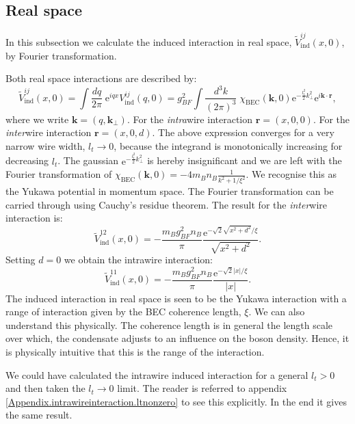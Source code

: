 \subsection{Real space}
\label{subsec.inducedinteraction.realspace}
In this subsection we calculate the induced interaction in real space, $\tilde{V}^{ij}_{\text{ind}}(x, 0)$, by Fourier transformation. 

Both real space interactions are described by: 
\begin{equation}
\tilde{V}^{ij}_{\text{ind}}(x, 0) = \int \frac{dq}{2\pi} \; \text{e}^{iqx} V^{ij}_{\text{ind}}(q, 0) = g^2_{BF}\int \frac{d^3 k}{(2\pi)^3}\;\chi_\text{BEC}(\mathbf{k}, 0)\text{e}^{-\frac{l_t^2}{2}k_\perp^2}\text{e}^{i\mathbf{k}\cdot \mathbf{r}}, \nonumber
\end{equation}
where we write $\mathbf{k} = (q, \mathbf{k}_{\perp})$. For the \textit{intra}wire interaction $\mathbf{r} = (x, 0, 0)$. For the \textit{inter}wire interaction $\mathbf{r} = (x, 0, d)$. The above expression converges for a very narrow wire width, $l_t \to 0$, because the integrand is monotonically increasing for decreasing $l_t$. The gaussian $\text{e}^{-\frac{l_t^2}{2}k_\perp^2}$ is hereby insignificant and we are left with the Fourier transformation of $\chi_\text{BEC}(\mathbf{k}, 0) = -4m_Bn_B\frac{1}{k^2 + 1/\xi^2}$. We recognise this as the Yukawa potential in momentum space. The Fourier transformation can be carried through using Cauchy's residue theorem. The result for the \textit{inter}wire interaction is:
\begin{equation}
\tilde{V}^{12}_{\text{ind}}(x, 0) = -\frac{m_Bg_{BF}^2n_B}{\pi}\frac{\text{e}^{ -\sqrt{2}\sqrt{x^2 + d^2}/\xi }}{\sqrt{x^2 + d^2}}.
\label{eq.V12indx}
\end{equation}
Setting $d = 0$ we obtain the intrawire interaction:
\begin{equation}
\tilde{V}^{11}_{\text{ind}}(x, 0) = -\frac{m_Bg_{BF}^2n_B}{\pi}\frac{\text{e}^{ -\sqrt{2}|x|/\xi }}{|x|}.
\label{eq.V11indx}
\end{equation}
The induced interaction in real space is seen to be the Yukawa interaction with a range of interaction given by the BEC coherence length, $\xi$. We can also understand this physically. The coherence length is in general the length scale over which, the condensate adjusts to an influence on the boson density. Hence, it is physically intuitive that this is the range of the interaction. 

We could have calculated the intrawire induced interaction for a general $l_t > 0$ and then taken the $l_t \to 0$ limit. The reader is referred to appendix \ref{Appendix.intrawireinteraction.ltnonzero} to see this explicitly. In the end it gives the same result. 

